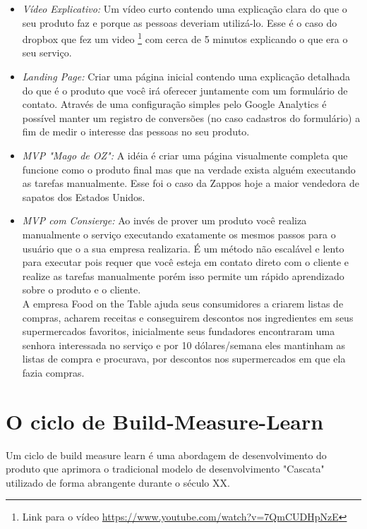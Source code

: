 \begin{itemize}
\item \emph{ Vídeo Explicativo:}
Um vídeo curto contendo uma explicação clara do que o seu produto faz e porque as pessoas deveriam utilizá-lo. Esse é o caso do dropbox que fez um video \footnote{Link para o vídeo  \url{https://www.youtube.com/watch?v=7QmCUDHpNzE}} com cerca de 5 minutos explicando o que era o seu serviço.
\item \emph{Landing Page:}
Criar uma página inicial contendo uma explicação detalhada do que é o produto que você irá oferecer juntamente com um formulário de contato. Através de uma configuração simples pelo Google Analytics é possível manter um registro de conversões (no caso cadastros do formulário)  a fim de medir o interesse das pessoas no seu produto.
\item \emph{MVP "Mago de OZ":}
A idéia é criar uma página visualmente completa que funcione como o produto final mas que na verdade  exista alguém  executando as tarefas manualmente. Esse foi o caso da Zappos hoje a maior vendedora de sapatos dos Estados Unidos.
\item \emph{ MVP com Consierge:}
Ao invés de prover um produto você realiza manualmente o serviço executando
exatamente os mesmos passos para o usuário que o a sua empresa realizaria. É um método não escalável e lento para executar pois requer que você esteja em contato direto com o cliente e realize as tarefas manualmente porém isso permite um rápido aprendizado sobre o produto e o cliente.
\\A empresa Food on the Table ajuda seus consumidores a criarem listas de compras, acharem receitas e conseguirem descontos nos ingredientes em seus supermercados favoritos, inicialmente seus fundadores encontraram uma senhora interessada no serviço e por 10 dólares/semana eles mantinham as listas de compra e procurava, por descontos nos supermercados em que ela fazia  compras.
\end{itemize}

\section{O ciclo de Build-Measure-Learn}

    \par Um ciclo de build measure learn é uma abordagem de desenvolvimento do produto que aprimora  o tradicional modelo de desenvolvimento "Cascata" utilizado de forma abrangente durante o século XX.

